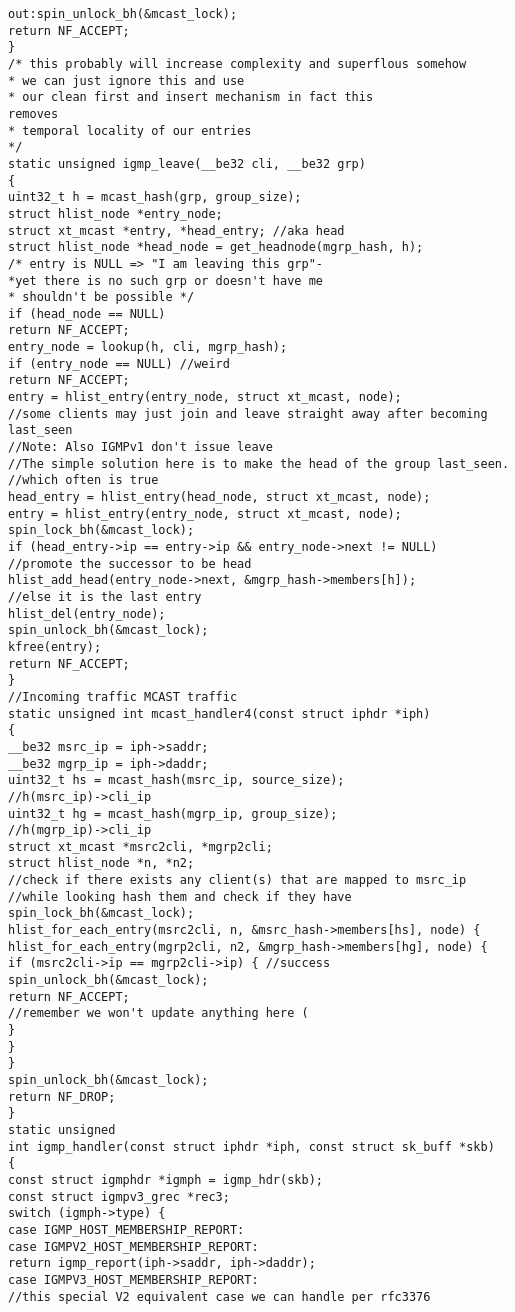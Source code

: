 \begin{verbatim}
out:spin_unlock_bh(&mcast_lock);
return NF_ACCEPT;
}
/* this probably will increase complexity and superflous somehow
* we can just ignore this and use
* our clean first and insert mechanism in fact this
removes
* temporal locality of our entries
*/
static unsigned igmp_leave(__be32 cli, __be32 grp)
{
uint32_t h = mcast_hash(grp, group_size);
struct hlist_node *entry_node;
struct xt_mcast *entry, *head_entry; //aka head
struct hlist_node *head_node = get_headnode(mgrp_hash, h);
/* entry is NULL => "I am leaving this grp"-
*yet there is no such grp or doesn't have me
* shouldn't be possible */
if (head_node == NULL)
return NF_ACCEPT;
entry_node = lookup(h, cli, mgrp_hash);
if (entry_node == NULL) //weird
return NF_ACCEPT;
entry = hlist_entry(entry_node, struct xt_mcast, node);
//some clients may just join and leave straight away after becoming last_seen
//Note: Also IGMPv1 don't issue leave
//The simple solution here is to make the head of the group last_seen.
//which often is true
head_entry = hlist_entry(head_node, struct xt_mcast, node);
entry = hlist_entry(entry_node, struct xt_mcast, node);
spin_lock_bh(&mcast_lock);
if (head_entry->ip == entry->ip && entry_node->next != NULL)
//promote the successor to be head
hlist_add_head(entry_node->next, &mgrp_hash->members[h]);
//else it is the last entry
hlist_del(entry_node);
spin_unlock_bh(&mcast_lock);
kfree(entry);
return NF_ACCEPT;
}
//Incoming traffic MCAST traffic
static unsigned int mcast_handler4(const struct iphdr *iph)
{
__be32 msrc_ip = iph->saddr;
__be32 mgrp_ip = iph->daddr;
uint32_t hs = mcast_hash(msrc_ip, source_size);
//h(msrc_ip)->cli_ip
uint32_t hg = mcast_hash(mgrp_ip, group_size);
//h(mgrp_ip)->cli_ip
struct xt_mcast *msrc2cli, *mgrp2cli;
struct hlist_node *n, *n2;
//check if there exists any client(s) that are mapped to msrc_ip
//while looking hash them and check if they have
spin_lock_bh(&mcast_lock);
hlist_for_each_entry(msrc2cli, n, &msrc_hash->members[hs], node) {
hlist_for_each_entry(mgrp2cli, n2, &mgrp_hash->members[hg], node) {
if (msrc2cli->ip == mgrp2cli->ip) { //success
spin_unlock_bh(&mcast_lock);
return NF_ACCEPT;
//remember we won't update anything here (
}
}
}
spin_unlock_bh(&mcast_lock);
return NF_DROP;
}
static unsigned
int igmp_handler(const struct iphdr *iph, const struct sk_buff *skb)
{
const struct igmphdr *igmph = igmp_hdr(skb);
const struct igmpv3_grec *rec3;
switch (igmph->type) {
case IGMP_HOST_MEMBERSHIP_REPORT:
case IGMPV2_HOST_MEMBERSHIP_REPORT:
return igmp_report(iph->saddr, iph->daddr);
case IGMPV3_HOST_MEMBERSHIP_REPORT:
//this special V2 equivalent case we can handle per rfc3376

\end{verbatim}

